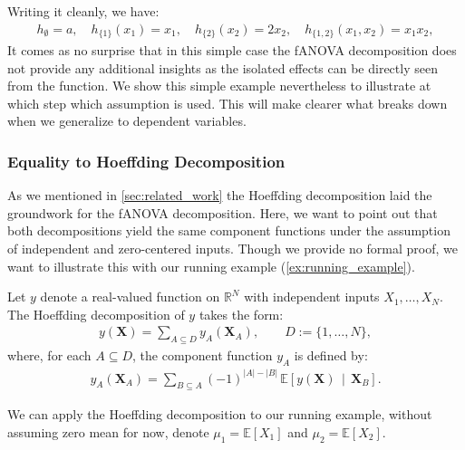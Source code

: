 Writing it cleanly, we have:
\begin{align}
    h_{\emptyset}=a,\quad
h_{\{1\}}(x_1)=x_1,\quad
h_{\{2\}}(x_2)=2x_2,\quad
h_{\{1,2\}}(x_1,x_2)=x_1 x_2,
\label{eq:running_example_fanova_components}    
\end{align}
It comes as no surprise that in this simple case the fANOVA decomposition does not provide any additional insights as the isolated effects can be directly seen from the function.
We show this simple example nevertheless to illustrate at which step which assumption is used.
This will make clearer what breaks down when we generalize to dependent variables.

\subsubsection{Equality to Hoeffding Decomposition}
As we mentioned in \autoref{sec:related_work} the Hoeffding decomposition laid the groundwork for the fANOVA decomposition.
Here, we want to point out that both decompositions yield the same component functions under the assumption of independent and zero-centered inputs. Though we provide no formal proof, we want to illustrate this with our running example (\autoref{ex:running_example}).

\begin{definition}\label{def:hoeffding_decomposition}
Let $y$ denote a real-valued function on $\mathbb{R}^N$ with independent inputs $X_1, \dots, X_N$. The Hoeffding decomposition of $y$ takes the form:
\begin{align}
    y(\boldsymbol{X})
=
\sum_{A \subseteq D} 
y_A(\boldsymbol{X}_A),
\qquad
D := \{1,\dots,N\},
\end{align}
where, for each $A \subseteq D$, the component function $y_A$ is defined by:
\begin{align}\label{eq:hoeffding_components}
    y_A(\boldsymbol{X}_A)
=
\sum_{B \subseteq A}
(-1)^{|A|-|B|}
\,\mathbb{E}\!\left[
  y(\boldsymbol{X}) 
  \,\middle|\, 
  \boldsymbol{X}_B
\right].
\end{align}
\end{definition}
We can apply the Hoeffding decomposition to our running example, without assuming zero mean for now, denote $\mu_1 = \mathbb{E}[X_1]$ and $\mu_2 = \mathbb{E}[X_2]$.

